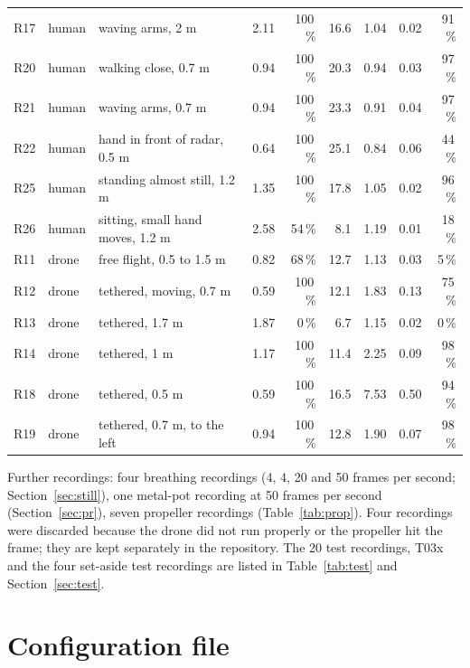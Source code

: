 \documentclass[11pt,a4paper]{article}
\begin{document}
\begin{table}[H]
\begin{tabular}{@{}lllrrrrrr@{}}
R17 & human & waving arms, 2 m & 2.11 & 100\,\% & 16.6 & 1.04 & 0.02 & 91\,\% \\
R20 & human & walking close, 0.7 m & 0.94 & 100\,\% & 20.3 & 0.94 & 0.03 & 97\,\% \\
R21 & human & waving arms, 0.7 m & 0.94 & 100\,\% & 23.3 & 0.91 & 0.04 & 97\,\% \\
R22 & human & hand in front of radar, 0.5 m & 0.64 & 100\,\% & 25.1 & 0.84 & 0.06 & 44\,\% \\
R25 & human & standing almost still, 1.2 m & 1.35 & 100\,\% & 17.8 & 1.05 & 0.02 & 96\,\% \\
R26 & human & sitting, small hand moves, 1.2 m & 2.58 & 54\,\% & 8.1 & 1.19 & 0.01 & 18\,\% \\
R11 & drone & free flight, 0.5 to 1.5 m & 0.82 & 68\,\% & 12.7 & 1.13 & 0.03 & 5\,\% \\
R12 & drone & tethered, moving, 0.7 m & 0.59 & 100\,\% & 12.1 & 1.83 & 0.13 & 75\,\% \\
R13 & drone & tethered, 1.7 m & 1.87 & 0\,\% & 6.7 & 1.15 & 0.02 & 0\,\% \\
R14 & drone & tethered, 1 m & 1.17 & 100\,\% & 11.4 & 2.25 & 0.09 & 98\,\% \\
R18 & drone & tethered, 0.5 m & 0.59 & 100\,\% & 16.5 & 7.53 & 0.50 & 94\,\% \\
R19 & drone & tethered, 0.7 m, to the left & 0.94 & 100\,\% & 12.8 & 1.90 & 0.07 & 98\,\% \\
\bottomrule
\end{tabular}
\end{table}

Further recordings: four breathing recordings (4, 4, 20 and 50 frames per second; Section~\ref{sec:still}), one metal-pot recording at 50 frames per second (Section~\ref{sec:pr}), seven propeller recordings (Table~\ref{tab:prop}). Four recordings were discarded because the drone did not run properly or the propeller hit the frame; they are kept separately in the repository. The 20 test recordings, T03x and the four set-aside test recordings are listed in Table~\ref{tab:test} and Section~\ref{sec:test}.

\section{Configuration file}\label{app:cfg}
\end{document}

